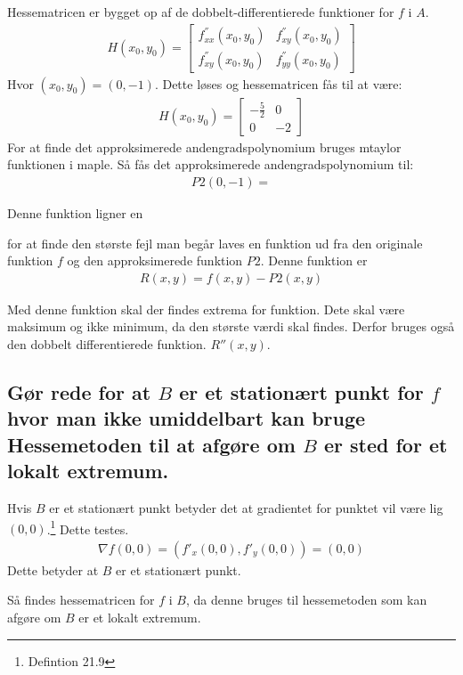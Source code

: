 Hessematricen er bygget op af de dobbelt-differentierede funktioner for $f$ i $A$. 
\begin{align}
    H(x_0,y_0)= 
    \left[
    \begin{array}{cc}
        f^{''}_{xx}(x_0,y_0) & f^{''}_{xy}(x_0,y_0)\\f^{''}_{xy}(x_0,y_0) & f^{''}_{yy}(x_0,y_0)
    \end{array}
\right] 
\end{align}
Hvor $(x_0,y_0)=(0,-1)$.
Dette løses og hessematricen fås til at være:
\begin{align}
    H(x_0,y_0)= 
    \left[
    \begin{array}{cc}
        -\frac{5}{2} & 0\\0 & -2
    \end{array}
\right] 
\end{align}
For at finde det approksimerede andengradspolynomium bruges mtaylor funktionen i maple. Så fås det approksimerede andengradspolynomium til:
\begin{align}
    P2(0,-1) = 
\end{align}

Denne funktion ligner en 

for at finde den største fejl man begår laves en funktion ud fra den originale funktion $f$ og den approksimerede funktion $P2$. Denne funktion er
\begin{align}
    R(x,y) = f(x,y)-P2(x,y)
\end{align}

Med denne funktion skal der findes extrema for funktion. Dete skal være maksimum og ikke minimum, da den største værdi skal findes. Derfor bruges også den dobbelt differentierede funktion. $R''(x,y)$. 

\subsection{Gør rede for at $B$ er et stationært punkt for $f$ hvor man ikke umiddelbart kan bruge Hessemetoden til at afgøre om $B$ er sted for et lokalt extremum.}

Hvis $B$ er et stationært punkt betyder det at gradientet for punktet vil være lig $(0,0)$.\footnote{Defintion 21.9} Dette testes.
\begin{align}
    \nabla f(0,0) = \left(f'_x(0,0),f'_y(0,0)\right) = (0,0)
\end{align}
Dette betyder at $B$ er et stationært punkt.

Så findes hessematricen for $f$ i $B$, da denne bruges til hessemetoden som kan afgøre om $B$ er et lokalt extremum.


